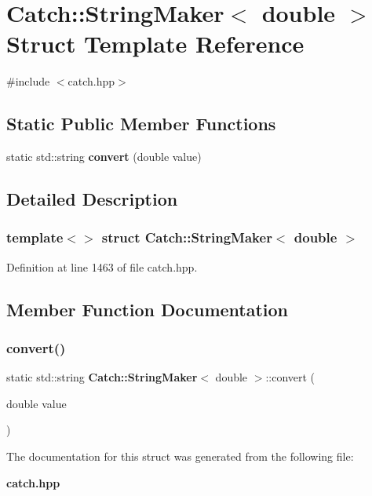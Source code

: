 \section{Catch\+::String\+Maker$<$ double $>$ Struct Template Reference}
\label{struct_catch_1_1_string_maker_3_01double_01_4}


{\ttfamily \#include $<$catch.\+hpp$>$}

\subsection*{Static Public Member Functions}
\begin{DoxyCompactItemize}
\item 
static std\+::string \textbf{ convert} (double value)
\end{DoxyCompactItemize}


\subsection{Detailed Description}
\subsubsection*{template$<$$>$\newline
struct Catch\+::\+String\+Maker$<$ double $>$}



Definition at line 1463 of file catch.\+hpp.



\subsection{Member Function Documentation}
\mbox{\label{struct_catch_1_1_string_maker_3_01double_01_4_acaa61529acad2462292c747d34e5f3d2}} 
\subsubsection{convert()}
{\footnotesize\ttfamily static std\+::string \textbf{ Catch\+::\+String\+Maker}$<$ double $>$\+::convert (\begin{DoxyParamCaption}\item[{double}]{value }\end{DoxyParamCaption})\hspace{0.3cm}{\ttfamily [static]}}



The documentation for this struct was generated from the following file\+:\begin{DoxyCompactItemize}
\item 
\textbf{ catch.\+hpp}\end{DoxyCompactItemize}

